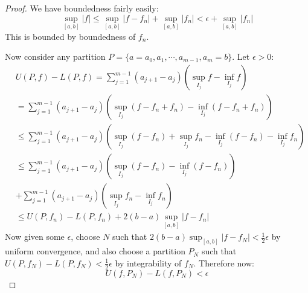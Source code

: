 \documentclass[../Main.tex]{subfiles}
\begin{document}
\begin{proof}
    We have boundedness fairly easily:
    \begin{equation*}
        \sup_{[a, b]} |f| \leq \sup_{[a, b]} |f - f_n| + \sup_{[a, b]} |f_n| < \epsilon + \sup_{[a,b]} |f_n|
    \end{equation*}
    This is bounded by boundedness of $f_n$.

    Now consider any partition $P = \{a = a_0, a_1, \cdots, a_{m-1}, a_m = b\}$. Let $\epsilon > 0$:
    \begin{align*}
        &U(P, f) - L(P, f) = \sum_{j=1}^{m-1} (a_{j+1} - a_j) \left(\sup_{I_j} f - \inf_{I_j} f\right) \\
        &= \sum_{j=1}^{m-1} (a_{j+1} - a_j) \left(\sup_{I_j} (f-f_n+f_n) - \inf_{I_j} (f-f_n+f_n)\right) \\
        &\leq \sum_{j=1}^{m-1} (a_{j+1} - a_j) \left(\sup_{I_j} (f-f_n) + \sup_{I_j} f_n - \inf_{I_j} (f-f_n) - \inf_{I_j}f_n\right) \\
        &\leq \sum_{j=1}^{m-1} (a_{j+1} - a_j) \left(\sup_{I_j} (f-f_n) - \inf_{I_j} (f-f_n) \right) \\
        &+ \sum_{j=1}^{m-1} (a_{j+1} - a_j) \left(\sup_{I_j} f_n - \inf_{I_j}f_n\right) \\
        &\leq U(P, f_n) - L(P, f_n) + 2(b-a)\sup_{[a, b]} |f - f_n|
    \end{align*}
    Now given some $\epsilon$, choose $N$ such that $2(b-a) \sup_{[a, b]} |f - f_N| < \frac12 \epsilon$ by uniform convergence, and also choose a partition $P_N$ such that $U(P, f_N) - L(P, f_N) < \frac12 \epsilon$ by integrability of $f_N$. Therefore now:
    \begin{equation*}
        U(f, P_N) - L(f, P_N) < \epsilon
    \end{equation*}
\end{proof}
\end{document}
